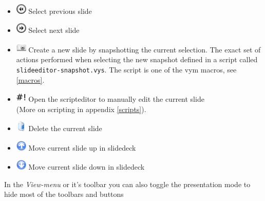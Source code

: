 \documentclass[12pt,a4paper]{article}
\newcommand{\vym}{{\sc vym }}
\begin{document}
\begin{itemize}
    \item
    \includegraphics[width=0.5cm]{../icons/slideprevious.png}
    Select previous slide

    \item
    \includegraphics[width=0.5cm]{../icons/slidenext.png}
    Select next slide

    \item
    \includegraphics[width=0.5cm]{../icons/slide-camera.png}
    Create a new slide by snapshotting the current selection. The exact
    set of actions performed when selecting the new snapshot defined in
    a script called {\tt slideeditor-snapshot.vys}. The script is one of
    the \vym macros, see \ref{macros}.

    \item
    \includegraphics[width=0.5cm]{../icons/scripteditor.png}
    Open the scripteditor to manually edit the current slide \\
    (More on scripting in appendix \ref{scripts}).
    
    \item
    \includegraphics[width=0.5cm]{../icons/edittrash.png}
    Delete the current slide
    
    \item
    \includegraphics[width=0.5cm]{../icons/up.png}
    Move current slide up in slidedeck
    
    \item
    \includegraphics[width=0.5cm]{../icons/down.png}
    Move current slide down in slidedeck
\end{itemize}
In the {\em View-menu} or it's toolbar you can also toggle the
presentation mode to hide most of the toolbars and buttons
\end{document}
